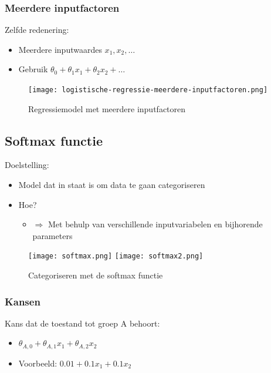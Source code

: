 \documentclass{article}
\begin{document}
\subsubsection{Meerdere inputfactoren}

Zelfde redenering:

\begin{itemize}
    \item Meerdere inputwaardes $x_1, x_2, \dots$
    \item Gebruik $\theta_0 + \theta_1x_1 + \theta_2x_2 + \dots$
\end{itemize}

\begin{figure}[H]
    \centering
    \texttt{[image: logistische-regressie-meerdere-inputfactoren.png]}
    \caption{Regressiemodel met meerdere inputfactoren}
\end{figure}


\subsection{Softmax functie}

Doelstelling:

\begin{itemize}
    \item Model dat in staat is om data te gaan categoriseren
    \item Hoe?
    \begin{itemize}
        \item $\Rightarrow$ Met behulp van verschillende inputvariabelen en bijhorende parameters 
    \end{itemize}
\end{itemize}

\begin{figure}[H]
    \centering
    \texttt{[image: softmax.png]}
    \texttt{[image: softmax2.png]}
    \caption{Categoriseren met de softmax functie}
\end{figure}

\subsubsection{Kansen}

Kans dat de toestand tot groep A behoort:

\begin{itemize}
    \item $\theta_{A,0} + \theta_{A,1}x_1 + \theta_{A,2}x_2$
    \item Voorbeeld: $0.01 + 0.1x_1 + 0.1x_2$
\end{itemize}
\end{document}
